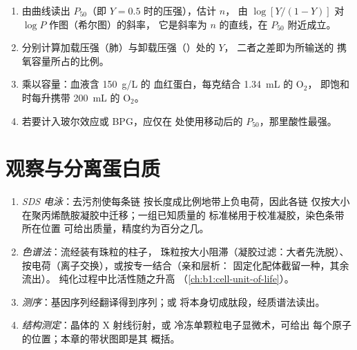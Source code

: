 \begin{method}[使用希尔方程]\label{met:b1:proteins:hill}
\begin{enumerate}
  \item 由曲线读出 $P_{50}$（即 $Y = 0.5$ 时的压强），估计 $n$，
        由 $\log[Y/(1-Y)]$ 对 $\log P$ 作图（希尔图）的斜率，
        它是斜率为 $n$ 的直线，在 $P_{50}$ 附近成立。
  \item 分别计算加载压强（肺）与卸载压强（）处的 $Y$，
        二者之差即为所输送的
        携氧容量所占的比例。
  \item 乘以容量：血液含 \qty{150}{g/L} 的
        血红蛋白，每克结合 \qty{1.34}{mL} 的 $\mathrm{O_2}$，
        即饱和时每升携带 \qty{200}{mL} 的 $\mathrm{O_2}$。
  \item 若要计入玻尔效应或 BPG，应仅在
        处使用移动后的 $P_{50}$，那里酸性最强。
\end{enumerate}
\end{method}

\section{观察与分离蛋白质}

\begin{method}[分离蛋白质]\label{met:b1:proteins:methods}
\begin{enumerate}
  \item \emph{SDS 电泳}：去污剂使每条链
        按长度成比例地带上负电荷，因此各链
        仅按大小在聚丙烯酰胺凝胶中迁移；一组已知质量的
        标准梯用于校准凝胶，染色条带所在位置
        可给出质量，精度约为百分之几。
  \item \emph{色谱法}：流经装有珠粒的柱子，
        珠粒按大小阻滞（凝胶过滤：大者先洗脱）、
        按电荷（离子交换），或按专一结合（亲和层析：
        固定化配体截留一种，其余流出）。
        纯化过程中比活性随之升高
        （\cref{ch:b1:cell-unit-of-life}）。
  \item \emph{测序}：基因序列经翻译得到序列；或
        将本身切成肽段，经质谱法读出。
  \item \emph{结构测定}：晶体的 X 射线衍射，或
        冷冻单颗粒电子显微术，可给出
        每个原子的位置；本章的带状图即是其
        概括。
\end{enumerate}
\end{method}

